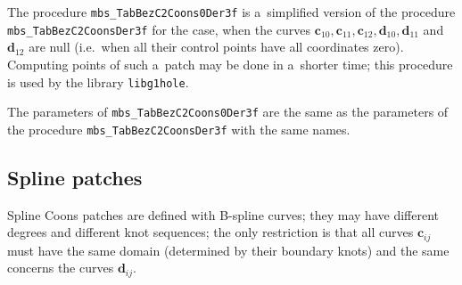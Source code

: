 \vspace{\bigskipamount}
\begin{sloppypar}
The procedure \texttt{mbs\_TabBezC2Coons0Der3f} is a~simplified version
of the procedure \texttt{mbs\_TabBezC2CoonsDer3f} for the case,
when the curves $\bm{c}_{10},\bm{c}_{11},\bm{c}_{12},\bm{d}_{10},\bm{d}_{11}$
and~$\bm{d}_{12}$ are null (i.e.\ when all their control points have all
coordinates zero). Computing points of such a~patch may be done in a~shorter time;
this procedure is used by the library \texttt{libg1hole}.%
\end{sloppypar}

The parameters of \texttt{mbs\_TabBezC2Coons0Der3f} are the same as
the parameters of the procedure \texttt{mbs\_TabBezC2CoonsDer3f}   
with the same names.


\newpage
\subsection{Spline patches}

Spline Coons patches are defined with B-spline curves; they may have
different degrees and different knot sequences; the only restriction is that
all curves $\bm{c}_{ij}$ must have the same domain (determined by their
boundary knots) and the same concerns the curves $\bm{d}_{ij}$.

